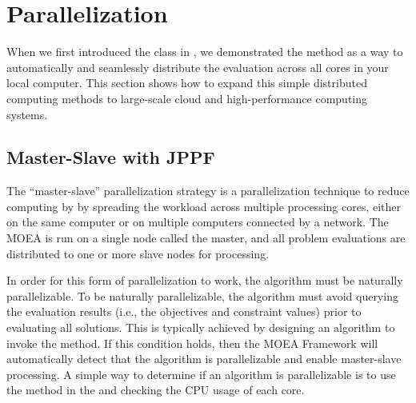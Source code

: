 %
%

\chapter{Parallelization}
\label{chpt:parallelization}

When we first introduced the  class in , we demonstrated the  method as a way to automatically and seamlessly distribute the evaluation across all cores in your local computer.  This section shows how to expand this simple distributed computing methods to large-scale cloud and high-performance computing systems.

\section{Master-Slave with JPPF}
\label{sect:masterSlave}

The ``master-slave'' parallelization strategy is a parallelization technique to reduce computing by by spreading the workload across multiple processing cores, either on the same computer or on multiple computers connected by a network.  The MOEA is run on a single node called the master, and all problem evaluations are distributed to one or more slave nodes for processing.

In order for this form of parallelization to work, the algorithm must be naturally parallelizable.  To be naturally parallelizable, the algorithm must avoid querying the evaluation results (i.e., the objectives and constraint values) prior to evaluating all solutions.  This is typically achieved by designing an algorithm to invoke the  method.  If this condition holds, then the MOEA Framework will automatically detect that the algorithm is parallelizable and enable master-slave processing.  A simple way to determine if an algorithm is parallelizable is to use the  method in the  and checking the CPU usage of each core. 

